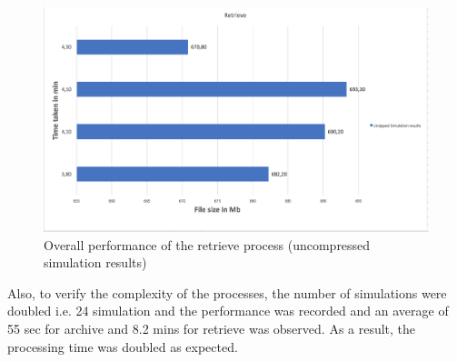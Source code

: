 \begin{figure}[H]
    \centering \includegraphics[scale=0.5]{grafiken/retrieveUnzip.png}
    \caption{Overall performance of the retrieve process (uncompressed simulation results)}
    \label{fig:restorePerformanceUn}
\end{figure}

Also, to verify the complexity of the processes, the number of simulations were doubled i.e. 24 simulation and the performance was recorded
and an average of 55 sec for archive and 8.2 mins for retrieve was observed. As a result, the processing time was doubled as expected.